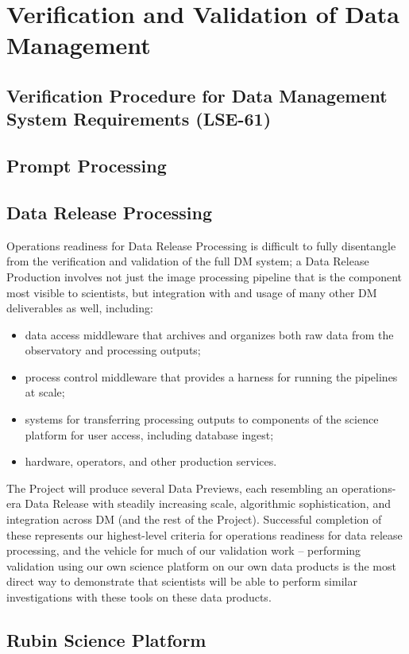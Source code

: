 \section{Verification and Validation of Data Management}  \label{sec:dm}


\subsection{Verification Procedure for Data Management System Requirements (LSE-61)}


\subsection{Prompt Processing}


\subsection{Data Release Processing}

Operations readiness for Data Release Processing is difficult to fully disentangle from the verification and validation of the full DM system; a Data Release Production involves not just the image processing pipeline that is the component most visible to scientists, but integration with and usage of many other DM deliverables as well, including:

\begin{itemize}
\item data access middleware that archives and organizes both raw data from the observatory and processing outputs;
\item process control middleware that provides a harness for running the pipelines at scale;
\item systems for transferring processing outputs to components of the science platform for user access, including database ingest;
\item hardware, operators, and other production services.
\end{itemize}

The Project will produce several Data Previews, each resembling an operations-era Data Release with steadily increasing scale, algorithmic sophistication,  and integration across DM (and the rest of the Project).
Successful completion of these represents our highest-level criteria for operations readiness for data release processing, and the vehicle for much of our validation work -- performing validation using our own science platform on our own data products is the most direct way to demonstrate that scientists will be able to perform similar investigations with these tools on these data products.

\subsection{Rubin Science Platform}
